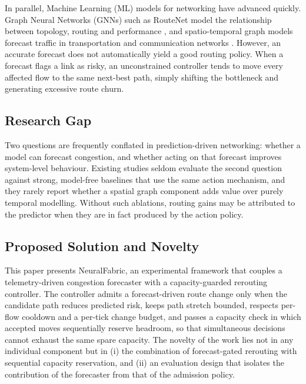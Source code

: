 \documentclass[conference]{IEEEtran}
\begin{document}
In parallel, Machine Learning (ML) models for networking have advanced quickly. Graph Neural Networks (GNNs) such as RouteNet model the relationship between topology, routing and performance \cite{rusek2020routenet}, and spatio-temporal graph models forecast traffic in transportation and communication networks \cite{li2018dcrnn,yu2018stgcn,zhao2020tgcn}. However, an accurate forecast does not automatically yield a good routing policy. When a forecast flags a link as risky, an unconstrained controller tends to move every affected flow to the same next-best path, simply shifting the bottleneck and generating excessive route churn.

\subsection{Research Gap}
Two questions are frequently conflated in prediction-driven networking: whether a model can forecast congestion, and whether acting on that forecast improves system-level behaviour. Existing studies seldom evaluate the second question against strong, model-free baselines that use the same action mechanism, and they rarely report whether a spatial graph component adds value over purely temporal modelling. Without such ablations, routing gains may be attributed to the predictor when they are in fact produced by the action policy.

\subsection{Proposed Solution and Novelty}
This paper presents NeuralFabric, an experimental framework that couples a telemetry-driven congestion forecaster with a capacity-guarded rerouting controller. The controller admits a forecast-driven route change only when the candidate path reduces predicted risk, keeps path stretch bounded, respects per-flow cooldown and a per-tick change budget, and passes a capacity check in which accepted moves sequentially reserve headroom, so that simultaneous decisions cannot exhaust the same spare capacity. The novelty of the work lies not in any individual component but in (i) the combination of forecast-gated rerouting with sequential capacity reservation, and (ii) an evaluation design that isolates the contribution of the forecaster from that of the admission policy.
\end{document}
